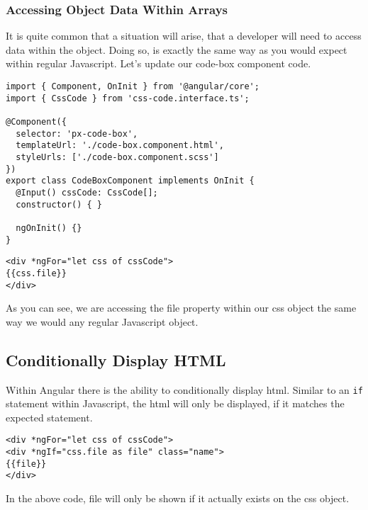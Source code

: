 \subsubsection{ Accessing Object Data Within Arrays }
It is quite common that a situation will arise, that a developer will need to 
access data within the object. Doing so, is exactly the same way as you would 
expect within regular Javascript. Let's update our code-box component code. 
\begin{lstlisting}[caption=px-code-box.component.ts]
import { Component, OnInit } from '@angular/core';
import { CssCode } from 'css-code.interface.ts';

@Component({
  selector: 'px-code-box',
  templateUrl: './code-box.component.html',
  styleUrls: ['./code-box.component.scss']
})
export class CodeBoxComponent implements OnInit {
  @Input() cssCode: CssCode[];
  constructor() { }

  ngOnInit() {}
} 
\end{lstlisting}
  
\begin{lstlisting}[caption=px-code-box.component.html]
<div *ngFor="let css of cssCode">
{{css.file}}
</div>   
\end{lstlisting} 

As you can see, we are accessing the file property within our css object the
same way we would any regular Javascript object.

\subsection{ Conditionally Display HTML }
Within Angular there is the ability to conditionally display html. Similar to 
an \lstinline{if} statement within Javascript, the html will only be 
displayed, if it matches the expected statement. 
\begin{lstlisting}
<div *ngFor="let css of cssCode">
<div *ngIf="css.file as file" class="name">
{{file}}
</div>   
\end{lstlisting}

In the above code, file will only be shown if it actually exists on the css 
object. 

